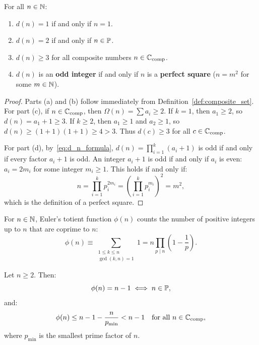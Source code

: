 \begin{corollary}
\label{cor:divisor_bounds}
\leanok
For all $n \in \mathbb{N}$:
\begin{enumerate}[label=(\alph*)]
  \item $d(n) = 1$ if and only if $n = 1$.
  \item $d(n) = 2$ if and only if $n \in \mathbb{P}$.
  \item $d(n) \ge 3$ for all composite numbers $n \in \mathbb{C}_{\mathrm{comp}}$.
  \item $d(n)$ is an \textbf{odd integer} if and only if $n$ is a \textbf{perfect square} ($n = m^2$ for some $m \in \mathbb{N}$).
\end{enumerate}
\end{corollary}

\begin{proof}
\leanok
Parts (a) and (b) follow immediately from Definition~\ref{def:composite_set}.
For part (c), if $n \in \mathbb{C}_{\mathrm{comp}}$, then $\Omega(n) = \sum a_i \ge 2$. If $k = 1$, then $a_1 \ge 2$, so $d(n) = a_1 + 1 \ge 3$. If $k \ge 2$, then $a_1 \ge 1$ and $a_2 \ge 1$, so $d(n) \ge (1+1)(1+1) \ge 4 > 3$. Thus $d(c) \ge 3$ for all $c \in \mathbb{C}_{\mathrm{comp}}$.

For part (d), by~\eqref{eq:d_n_formula}, $d(n) = \prod_{i=1}^k (a_i + 1)$ is odd if and only if every factor $a_i + 1$ is odd. An integer $a_i + 1$ is odd if and only if $a_i$ is even: $a_i = 2 m_i$ for some integer $m_i \ge 1$.
This holds if and only if:
$$n = \prod_{i=1}^k p_i^{2 m_i} = \left( \prod_{i=1}^k p_i^{m_i} \right)^2 = m^2,$$
which is the definition of a perfect square.
\end{proof}

\begin{definition}
\label{def:totient_function}
\leanok
For $n \in \mathbb{N}$, Euler's totient function $\phi(n)$ counts the number of positive integers up to $n$ that are coprime to $n$:
\begin{equation}
\label{eq:totient_def}
\phi(n) \equiv \sum_{\substack{1 \le k \le n \\ \gcd(k, n) = 1}} 1 = n \prod_{p \mid n} \left(1 - \frac{1}{p}\right).
\end{equation}
\end{definition}

\begin{proposition}
\label{prop:totient_gap}
\leanok
Let $n \ge 2$. Then:
\begin{equation}
\phi(n) = n - 1 \iff n \in \mathbb{P},
\end{equation}
and:
\begin{equation}
\phi(n) \le n - 1 - \frac{n}{p_{\min}} < n - 1 \quad \text{for all } n \in \mathbb{C}_{\mathrm{comp}},
\end{equation}
where $p_{\min}$ is the smallest prime factor of $n$.
\end{proposition}

